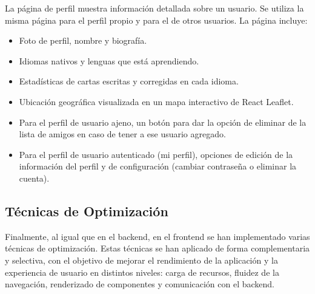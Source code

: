 La página de perfil muestra información detallada sobre un usuario. Se utiliza la misma página para el perfil propio y para el de otros usuarios. La página incluye:

\begin{itemize}[label=-]
    \item Foto de perfil, nombre y biografía.
    \item Idiomas nativos y lenguas que está aprendiendo.
    \item Estadísticas de cartas escritas y corregidas en cada idioma.
    \item Ubicación geográfica visualizada en un mapa interactivo de React Leaflet.
    \item Para el perfil de usuario ajeno, un botón para dar la opción de eliminar de la lista de amigos en caso de tener a ese usuario agregado.
    \item Para el perfil de usuario autenticado (mi perfil), opciones de edición de la información del perfil y de configuración (cambiar contraseña o eliminar la cuenta).
\end{itemize}

\subsection{Técnicas de Optimización}

Finalmente, al igual que en el backend, en el frontend se han implementado varias técnicas de optimización. Estas técnicas se han aplicado de forma complementaria y selectiva, con el objetivo de mejorar el rendimiento de la aplicación y la experiencia de usuario en distintos niveles: carga de recursos, fluidez de la navegación, renderizado de componentes y comunicación con el backend.


